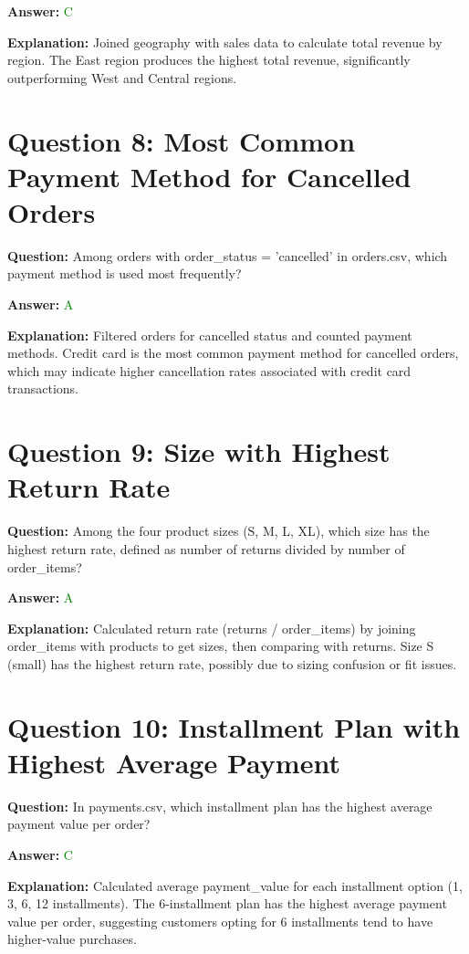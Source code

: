 \documentclass{article}
\begin{document}
\textbf{Answer:} \textcolor{green}{C}

\textbf{Explanation:} Joined geography with sales data to calculate total revenue by region. The East region produces the highest total revenue, significantly outperforming West and Central regions.

\bigskip

\section*{Question 8: Most Common Payment Method for Cancelled Orders}
\textbf{Question:} Among orders with order\_status = 'cancelled' in orders.csv, which payment method is used most frequently?

\textbf{Answer:} \textcolor{green}{A}

\textbf{Explanation:} Filtered orders for cancelled status and counted payment methods. Credit card is the most common payment method for cancelled orders, which may indicate higher cancellation rates associated with credit card transactions.

\bigskip

\section*{Question 9: Size with Highest Return Rate}
\textbf{Question:} Among the four product sizes (S, M, L, XL), which size has the highest return rate, defined as number of returns divided by number of order\_items?

\textbf{Answer:} \textcolor{green}{A}

\textbf{Explanation:} Calculated return rate (returns / order\_items) by joining order\_items with products to get sizes, then comparing with returns. Size S (small) has the highest return rate, possibly due to sizing confusion or fit issues.

\bigskip

\section*{Question 10: Installment Plan with Highest Average Payment}
\textbf{Question:} In payments.csv, which installment plan has the highest average payment value per order?

\textbf{Answer:} \textcolor{green}{C}

\textbf{Explanation:} Calculated average payment\_value for each installment option (1, 3, 6, 12 installments). The 6-installment plan has the highest average payment value per order, suggesting customers opting for 6 installments tend to have higher-value purchases.
\end{document}
